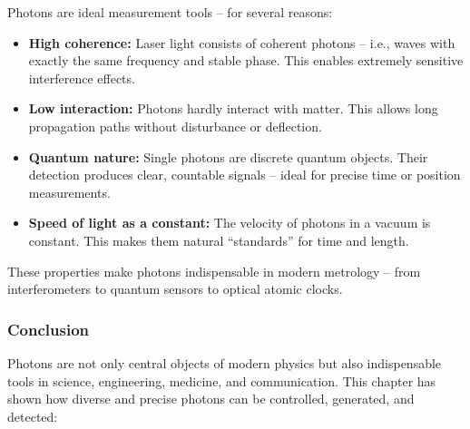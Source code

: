 \vspace{1em}
\begin{tcolorbox}[didaktikbox, title=Why Are Photons So Precisely Measurable? \label{box:photonen_genau}]
	\small
	Photons are ideal measurement tools – for several reasons:
	
	\begin{itemize}
		\item \textbf{High coherence:} Laser light consists of coherent photons – i.e., waves with exactly the same frequency and stable phase. This enables extremely sensitive interference effects.
		\item \textbf{Low interaction:} Photons hardly interact with matter. This allows long propagation paths without disturbance or deflection.
		\item \textbf{Quantum nature:} Single photons are discrete quantum objects. Their detection produces clear, countable signals – ideal for precise time or position measurements.
		\item \textbf{Speed of light as a constant:} The velocity of photons in a vacuum is constant. This makes them natural “standards” for time and length.
	\end{itemize}
	
	These properties make photons indispensable in modern metrology – from interferometers to quantum sensors to optical atomic clocks.
\end{tcolorbox}

\subsubsection{Conclusion}

Photons are not only central objects of modern physics but also indispensable tools in science, engineering, medicine, and communication. This chapter has shown how diverse and precise photons can be controlled, generated, and detected:

